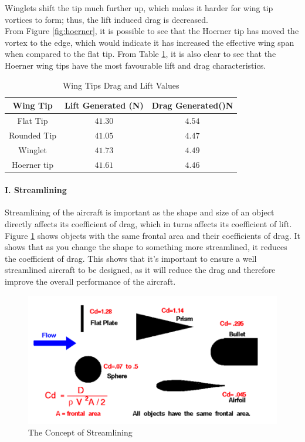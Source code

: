 \documentclass[12pt]{article}
\begin{document}
\noindent Winglets shift the tip much further up, which makes it harder for wing tip vortices to form; thus, the lift induced drag is decreased. \\

\noindent From Figure \ref{fig:hoerner}, it is possible to see that the Hoerner tip has moved the vortex to the edge, which would indicate it has increased the effective wing span when compared to the flat tip. From Table \ref{fig:wingdrag}, it is also clear to see that the Hoerner wing tips have the most favourable lift and drag characteristics. \\

\begin{table}[h]
\centering
\begin{tabular}{|c|c|c|}
\hline
\textbf{Wing Tip} &  \textbf{Lift Generated (N)} & \textbf{Drag Generated()N} 
\\ \hline Flat Tip & $41.30$ & $4.54$
\\ \hline Rounded Tip & $41.05$ & $4.47$
\\ \hline Winglet & $41.73$ & $4.49$
\\ \hline Hoerner tip & $41.61$ & $4.46$
\\ \hline
\end{tabular}
\caption{Wing Tips Drag and Lift Values }
\label{fig:wingdrag}
\end{table}

\paragraph{I. Streamlining} Streamlining of the aircraft is important as the shape and size of an object directly affects its coefficient of drag, which in turns affects its coefficient of lift. \\

\noindent Figure \ref{fig:streamline} shows objects with the same frontal area and their coefficients of drag. It shows that as you change the shape to something more streamlined, it reduces the coefficient of drag. This shows that it’s important to ensure a well streamlined aircraft to be designed, as it will reduce the drag and therefore improve the overall performance of the aircraft. \\

\begin{figure}[H]
\includegraphics[width=15cm, scale=1]{streamlinenasa.png}
\caption{The Concept of Streamlining \cite{NASAREF}}
\label{fig:streamline}
\end{figure}
\end{document}
